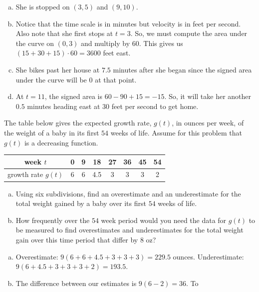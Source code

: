 \documentclass[11pt]{exam}
\begin{document}
\begin{questions}
\begin{enumerate}[(a)]
\end{enumerate}
\begin{solution}
  \begin{enumerate}[(a)]
  \item She is stopped on \((3,5)\) and \((9,10)\). 
  \item Notice that the time scale is in minutes but velocity is in
    feet per second. Also note that she first stops at \(t=3\). So, we
    must compute the area under the curve on \((0,3)\) and multiply by
    \(60\). This gives us \((15+30+15)\cdot 60 = 3600\) feet east.
  \item She bikes past her house at \(7.5\) minutes after she began
    since the signed area under the curve will be \(0\) at that point.
  \item At \(t=11\), the signed area is \(60-90+15 = -15\). So, it
    will take her another \(0.5\) minutes heading east at \(30\) feet
    per second to get home.
  \end{enumerate}
\end{solution}
\question The table below gives the expected growth rate, $g(t)$, in ounces per week, of the weight of a baby in its first $54$ weeks of life. Assume for this 
problem that $g(t)$ is a decreasing function. 
\begin{center}
\begin{tabular}{|c||c|c|c|c|c|c|c|}
\hline
week $t$ &0 & 9& 18& 27 &36&45 & 54 \\
\hline
growth rate $g(t)$ & 6 & 6 & 4.5 &3  &3 &3 &2   \\
\hline
\end{tabular}
\end{center}
\begin{enumerate}[(a)]
	\item Using six subdivisions, find an overestimate and an underestimate for the total weight gained by a baby over its first $54$ weeks of life.
	\item How frequently over the $54$ week period would you need the data for $g(t)$ to be measured to find overestimates and underestimates for the total weight gain 
over this time period that differ by $8$ oz?
\end{enumerate}
\begin{solution}
  \begin{enumerate}[(a)]
  \item Overestimate: \(9 (6+6+4.5+3+3+3) = 229.5\) ounces. Underestimate:
    \(9(6+4.5+3+3+3+2) = 193.5\).
  \item The difference between our estimates is \(9(6-2) = 36\). To

\end{enumerate}
\end{solution}
\end{questions}
\end{document}
